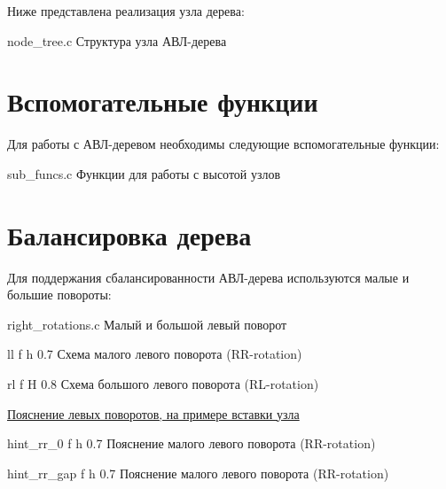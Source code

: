 \documentclass{bmstu}
\begin{document}
    Ниже представлена реализация узла дерева:

        {node_tree.c}
        {Структура узла АВЛ-дерева}

    \section{Вспомогательные функции}

    Для работы с АВЛ-деревом необходимы следующие вспомогательные функции:

        {sub_funcs.c}
        {Функции для работы с высотой узлов}
    

    \section{Балансировка дерева}

    Для поддержания сбалансированности АВЛ-дерева используются малые и большие повороты:

        {right_rotations.c}
        {Малый и большой левый поворот}

        {ll} %
        {f} %
        {h} %
        {0.7\textwidth} %
        {Схема малого левого поворота (RR-rotation)} %

        {rl} %
        {f} %
        {H} %
        {0.8\textwidth} %
        {Схема большого левого поворота (RL-rotation)} %

    
    \underline{Пояснение левых поворотов, на примере вставки узла}

        {hint_rr_0} %
        {f} %
        {h} %
        {0.7\textwidth} %
        {Пояснение малого левого поворота (RR-rotation)} %

        {hint_rr_gap} %
        {f} %
        {h} %
        {0.7\textwidth} %
        {Пояснение малого левого поворота (RR-rotation)}
\end{document}
